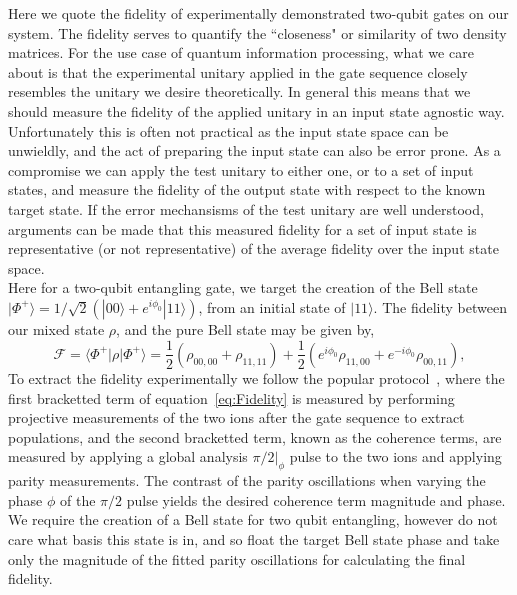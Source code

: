     Here we quote the fidelity of experimentally demonstrated two-qubit gates on
    our system. The fidelity serves to quantify the ``closeness" or similarity of
    two density matrices.  For the use case of quantum information processing, what we
    care about is that the experimental unitary applied in the gate sequence closely resembles the unitary we desire theoretically. In general this
    means that we should measure the fidelity of the applied unitary in an input
    state agnostic way. Unfortunately this is often not practical as the input
    state space can be unwieldly, and the act of preparing the input state can
    also be error prone. As a compromise we can apply the test unitary to either
    one, or to a set of input states, and measure the fidelity of the output state
    with respect to the known target state. If the error mechansisms of the test
    unitary are well understood, arguments can be made that this measured
    fidelity for a set of input state is representative (or not representative)
    of the average fidelity over the input state space.\\
    Here for a two-qubit entangling gate, we target the creation of the Bell
    state $|\Phi^+\rangle = 1/\sqrt{2} \left( |00\rangle +
    e^{i\phi_0}|11\rangle \right)$, from an initial state of $|11\rangle$.
    The fidelity between our mixed state $\rho$, and the pure Bell state may be
    given by,
    \begin{equation}
        \mathcal{F} = \langle \Phi^+ | \rho | \Phi^+ \rangle = \frac{1}{2} \left( \rho_{00,00} + \rho_{11,11} \right) + \frac{1}{2}\left( e^{i\phi_0}\rho_{11,00}+e^{-i\phi_0}\rho_{00,11}\right),
        \label{eq:Fidelity}
    \end{equation}
    To extract the fidelity experimentally we follow the popular
    protocol~\cite{XXX}, where the first bracketted term of
    equation~\ref{eq:Fidelity} is measured by performing projective measurements
    of the two ions after the gate sequence to extract populations, and the second bracketted term,
    known as the coherence terms, are measured by applying a global analysis
    $\pi/2|_\phi$ pulse to the two ions and applying parity measurements. The
    contrast of the parity oscillations when varying the phase $\phi$ of the
    $\pi/2$ pulse yields the desired coherence term magnitude and phase. We require the creation of a Bell state for two qubit entangling, however do not care what basis this state is in, and so float the target Bell state phase and take only the magnitude of the fitted parity oscillations for calculating the final fidelity.\\

